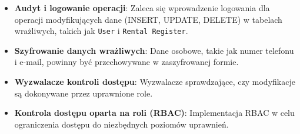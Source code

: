\documentclass{article}
\begin{document}
\begin{itemize}
    \item \textbf{Audyt i logowanie operacji}: Zaleca się wprowadzenie logowania dla operacji modyfikujących dane (INSERT, UPDATE, DELETE) w tabelach wrażliwych, takich jak \texttt{User} i \texttt{Rental Register}.
    \item \textbf{Szyfrowanie danych wrażliwych}: Dane osobowe, takie jak numer telefonu i e-mail, powinny być przechowywane w zaszyfrowanej formie.
    \item \textbf{Wyzwalacze kontroli dostępu}: Wyzwalacze sprawdzające, czy modyfikacje są dokonywane przez uprawnione role.
    \item \textbf{Kontrola dostępu oparta na roli (RBAC)}: Implementacja RBAC w celu ograniczenia dostępu do niezbędnych poziomów uprawnień.
\end{itemize}
\end{document}
